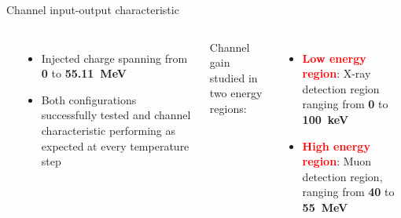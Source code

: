 \documentclass[aspectratio=169,xcolor=dvipsnames]{beamer} %
\newcommand{\greencheck}{{\color{ForestGreen}\checkmark}}
\begin{document}
\begin{frame}{Channel input-output characteristic}
\begin{columns}
\begin{center}
            \end{center}    
            \vskip-0.2cm
            \begin{itemize}
                \item Injected charge spanning from \textbf{0} to \textbf{\SI{55.11}{\mega\electronvolt}} \greencheck
                \item Both configurations successfully tested and channel characteristic performing as expected at every temperature step \greencheck
            \end{itemize}
            \vskip0.3cm
            Channel gain studied in two energy regions:
            \begin{itemize}
                \item \textbf{\textcolor{Red}{Low energy region}}: X-ray detection region ranging from \textbf{0} to \textbf{\SI{100}{\kilo\electronvolt}}
                \item \textbf{\textcolor{Red}{High energy region}}: Muon detection region, ranging from \textbf{40} to \textbf{\SI{55}{\mega\electronvolt}}
            \end{itemize}
            \vspace{0.4cm}
    \end{columns}
\end{frame}


\end{document}
